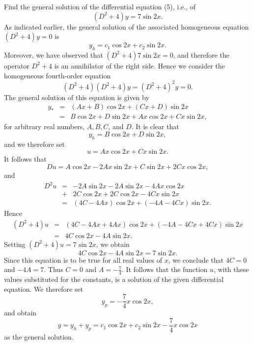 \begin{example} Find the general solution of the differential equation (5), i.e., of 
$$
(D^2 + 4)y = 7 \sin 2x.
$$
As indicated earlier, the general solution of the associated homogeneous equation $(D^2 + 4)y = 0$
is
$$
y_h = c_1 \cos 2x + c_2 \sin 2x.
$$
Moreover, we have observed that $(D^2 + 4)7 \sin 2x = 0$, and therefore the operator $D^2 + 4$ is an annihilator of the right side. Hence we consider the homogeneous fourth-order equation
$$
(D^2 + 4)(D^2 + 4)y = (D^2 + 4)^2 y = 0. 
$$
The general solution of this equation is given by 
\begin{eqnarray*}
y_* &=& (Ax + B) \cos 2x + (Cx + D) \sin 2x \\
      &=& B \cos 2x + D \sin 2x + Ax \cos 2x + Cx \sin 2x, 
\end{eqnarray*}
for arbitrary real numbers, $A, B, C$, and $D$. It is clear that
$$
y_h = B \cos 2x + D \sin 2x, 
$$
and we therefore set
$$
u = Ax \cos 2x + Cx \sin 2x. 
$$
It follows that
$$
Du = A \cos 2x - 2Ax \sin 2x + C \sin 2x + 2Cx \cos 2x, 
$$
and
\begin{eqnarray*}
D^2u &=& - 2A\sin2x - 2A\sin2x - 4Ax\cos2x \\
         &+& 2C \cos 2x + 2C \cos 2x - 4Cx \sin 2x \\
         &=& (4C - 4Ax) \cos 2x + ( - 4A - 4Cx) \sin 2x. 
\end{eqnarray*}
Hence 
\begin{eqnarray*}
(D^2 + 4)u &=& (4C - 4Ax + 4Ax) \cos 2x + ( -4A - 4Cx + 4Cx) \sin 2x \\
                  &=& 4C \cos 2x - 4A \sin 2x. 
\end{eqnarray*}
Setting $(D^2 + 4)u = 7 \sin 2x$, we obtain
$$
4C \cos 2x - 4A \sin 2x = 7 \sin 2x. 
$$
Since this equation is to be true for all real values of $x$, we
conclude that $4C = 0$ and $- 4A = 7$. Thus $C = 0$ and $A = - \frac{7}{4}$. It follows that the function $u$, with these values substituted for the constants, is a solution of the given differential equation. We therefore set
$$
y_p = - \frac{7}{4} x \cos 2x, 
$$
and obtain
$$
y = y_h + y_p = c_1 \cos 2x + c_2 \sin 2x - \frac{7}{4} x \cos 2x 
$$
as the general solution.
\end{example}

